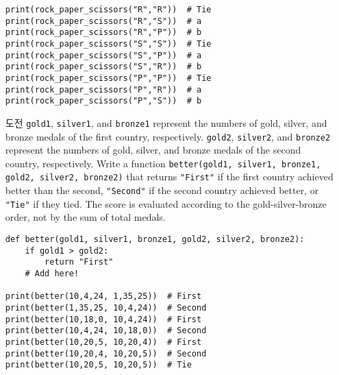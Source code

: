 \documentclass[../main.tex]{subfiles}
\begin{document}
\begin{enumerate}
\begin{verbatim}
print(rock_paper_scissors("R","R"))  # Tie
print(rock_paper_scissors("R","S"))  # a
print(rock_paper_scissors("R","P"))  # b
print(rock_paper_scissors("S","S"))  # Tie
print(rock_paper_scissors("S","P"))  # a
print(rock_paper_scissors("S","R"))  # b
print(rock_paper_scissors("P","P"))  # Tie
print(rock_paper_scissors("P","R"))  # a
print(rock_paper_scissors("P","S"))  # b
\end{verbatim}

\item[도전] \texttt{gold1}, \texttt{silver1}, and \texttt{bronze1} represent the
  numbers of gold, silver, and bronze medals of the first country,
  respectively.  \texttt{gold2}, \texttt{silver2}, and \texttt{bronze2}
  represent the numbers of gold, silver, and bronze medals of the second
  country, respectively.  Write a function \texttt{better(gold1, silver1,
  bronze1, gold2, silver2, bronze2)} that returns \texttt{"First"} if the first
  country achieved better than the second, \texttt{"Second"} if the second
  country achieved better, or \texttt{"Tie"} if they tied.  The score is
  evaluated according to the gold-silver-bronze order, not by the sum of total
  medals. 
\begin{verbatim}
def better(gold1, silver1, bronze1, gold2, silver2, bronze2):
    if gold1 > gold2:
        return "First"
    # Add here!

print(better(10,4,24, 1,35,25))  # First
print(better(1,35,25, 10,4,24))  # Second
print(better(10,18,0, 10,4,24))  # First
print(better(10,4,24, 10,18,0))  # Second
print(better(10,20,5, 10,20,4))  # First
print(better(10,20,4, 10,20,5))  # Second
print(better(10,20,5, 10,20,5))  # Tie
\end{verbatim}

\end{enumerate}
\end{document}
